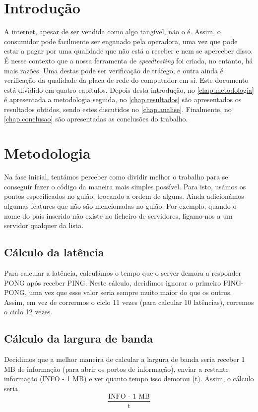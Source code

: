 \documentclass{report}
\begin{document}
\tableofcontents
\listoftables     %


\clearpage
{}

\chapter{Introdução}
\label{chap.introducao}
A internet, apesar de ser vendida como algo tangível, não o é. Assim, o consumidor pode facilmente ser enganado pela operadora, uma vez que pode estar a pagar por uma qualidade que não está a receber e nem se aperceber disso. É nesse contexto que a nossa ferramenta de \textit{speedtesting} foi criada, no entanto, há mais razões. Uma destas pode ser verificação de tráfego, e outra ainda é verificação da qualidade da placa de rede do computador em si.
Este documento está dividido em quatro capítulos.
Depois desta introdução,
no \autoref{chap.metodologia} é apresentada a metodologia seguida,
no \autoref{chap.resultados} são apresentados os resultados obtidos,
sendo estes discutidos no \autoref{chap.analise}.
Finalmente, no \autoref{chap.conclusao} são apresentadas
as conclusões do trabalho.

\chapter{Metodologia}
\label{chap.metodologia}
Na fase inicial, tentámos perceber como dividir melhor o trabalho para se conseguir fazer o código da maneira mais simples possível. Para isto, usámos os pontos especificados no guião, trocando a ordem de alguns. 
Ainda adicionámos algumas features que não são mencionadas no guião. Por exemplo, quando o nome do país inserido não existe no ficheiro de servidores, ligamo-nos a um servidor qualquer da lista.

\section{Cálculo da latência}
Para calcular a latência, calculámos o tempo que o server demora a responder PONG após receber PING.
Neste cálculo, decidimos ignorar o primeiro PING-PONG, uma vez que esse valor seria sempre muito maior do que os outros. Assim, em vez de corrermos o ciclo 11 vezes (para calcular 10 latências), corremos o ciclo 12 vezes.

\section{Cálculo da largura de banda}
Decidimos que a melhor maneira de calcular a largura de banda seria receber 1 MB de informação (para abrir os portos de informação), enviar a restante informação (INFO - 1 MB) e ver quanto tempo isso demorou (t). Assim, o cálculo seria
\[\frac{\text{INFO - 1 MB}}{\text{t}}\]
\end{document}
